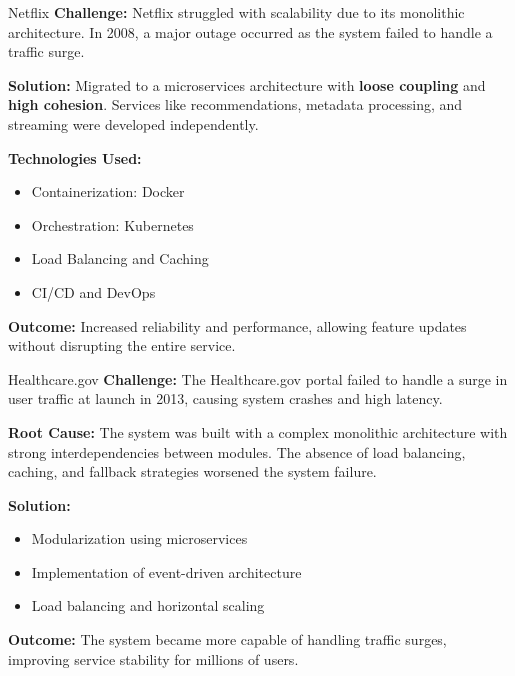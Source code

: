 \documentclass[aspectratio=169, table]{beamer}
\begin{document}
\begin{frame}{\LARGE{Netflix}}
	\vspace{20pt}
\textbf{Challenge:}  
Netflix struggled with scalability due to its monolithic architecture. In 2008, a major outage occurred as the system failed to handle a traffic surge.

\textbf{Solution:}  
Migrated to a microservices architecture with \textbf{loose coupling} and \textbf{high cohesion}. Services like recommendations, metadata processing, and streaming were developed independently.

	\textbf{Technologies Used:}  
	\begin{itemize}
		\item Containerization: Docker
		\item Orchestration: Kubernetes
		\item Load Balancing and Caching
		\item CI/CD and DevOps
	\end{itemize}
	
	\textbf{Outcome:}  
	Increased reliability and performance, allowing feature updates without disrupting the entire service.
\end{frame}

\begin{frame}{\LARGE{Healthcare.gov}}
	\vspace{20pt}
	\textbf{Challenge:}  
	The Healthcare.gov portal failed to handle a surge in user traffic at launch in 2013, causing system crashes and high latency.
	
	\textbf{Root Cause:}  
	The system was built with a complex monolithic architecture with strong interdependencies between modules. The absence of load balancing, caching, and fallback strategies worsened the system failure.
	
	\textbf{Solution:}  
	\begin{itemize}
		\item Modularization using microservices
		\item Implementation of event-driven architecture
		\item Load balancing and horizontal scaling
	\end{itemize}
	
	\textbf{Outcome:}  
	The system became more capable of handling traffic surges, improving service stability for millions of users.
\end{frame}
\end{document}
